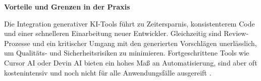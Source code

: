 \vspace{1em}
\noindent
\textbf{Vorteile und Grenzen in der Praxis}

Die Integration generativer KI-Tools führt zu Zeitersparnis, konsistenterem
Code und einer schnelleren Einarbeitung neuer Entwickler. Gleichzeitig sind
Review-Prozesse und ein kritischer Umgang mit den generierten Vorschlägen
unerlässlich, um Qualitäts- und Sicherheitsrisiken zu minimieren.
Fortgeschrittene Tools wie Cursor AI oder Devin AI bieten ein hohes Maß an
Automatisierung, sind aber oft kostenintensiv und noch nicht für alle
Anwendungsfälle ausgereift \cite[S.~13]{donvir_role_2024}.

